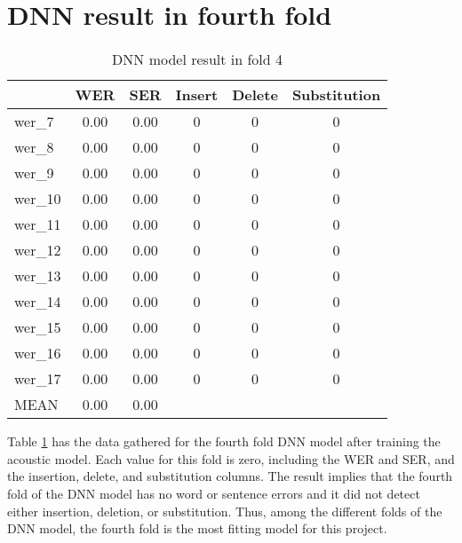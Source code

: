 \section{DNN result in fourth fold}
\begin{table}[htb]   %
        \setlength{\extrarowheight}{0.3em}
 	\centering
 	\begin{tabular}{|p{1in}|c|c|c|c|c|} \hline
 		\centering  & WER & SER & Insert & Delete & Substitution \\ \hline
 		\centering wer\_7 & 0.00 & 0.00 & 0 & 0 & 0 \\ 
 		\centering wer\_8 & 0.00 & 0.00 & 0 & 0 & 0 \\ 
            \centering wer\_9 & 0.00 & 0.00 & 0 & 0 & 0 \\ 
            \centering wer\_10 & 0.00 & 0.00 & 0 & 0 & 0 \\ 
            \centering wer\_11 & 0.00 & 0.00 & 0 & 0 & 0 \\ 
            \centering wer\_12 & 0.00 & 0.00 & 0 & 0 & 0 \\ 
            \centering wer\_13 & 0.00 & 0.00 & 0 & 0 & 0 \\ 
            \centering wer\_14 & 0.00 & 0.00 & 0 & 0 & 0 \\ 
            \centering wer\_15 & 0.00 & 0.00 & 0 & 0 & 0 \\ 
            \centering wer\_16 & 0.00 & 0.00 & 0 & 0 & 0 \\ 
            \centering wer\_17 & 0.00 & 0.00 & 0 & 0 & 0 \\ \hline
            \centering MEAN & 0.00 & 0.00 & & & \\ \hline
 	\end{tabular}
         \caption{DNN model result in fold 4} 
 	\label{tab:dnn_fold_4}
\end{table}

Table \ref{tab:dnn_fold_4} has the data gathered for the fourth fold DNN model after training the acoustic model. Each value for this fold is zero, including the WER and SER, and the insertion, delete, and substitution columns. The result implies that the fourth fold of the DNN model has no word or sentence errors and it did not detect either insertion, deletion, or substitution. Thus, among the different folds of the DNN model, the fourth fold is the most fitting model for this project.